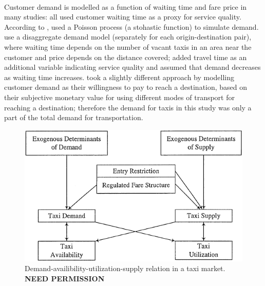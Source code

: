 \paragraph{}Customer demand is modelled as a function of waiting time and fare
price in many studies: \textcite{Douglas1972taxi+regulation,
Devany1975taxi+capacity, Cairns1996taxi+competition, Yang2002taxi+demand} all
used customer waiting time as a proxy for service quality. According to
\textcite{Salanova2011taxi+review}, \textcite{Manski1967taxi+demand} used a
Poisson process (a stohastic function) to simulate demand.
\textcite{Yang2002taxi+demand} use a disaggregate demand model (separately for
each origin-destination pair), where waiting time depends on the number of
vacant taxis in an area near the customer and price depends on the distance
covered; \textcite{Yang2010taxi+nonlinear} added travel time as an additional
variable indicating service quality and assumed that demand decreases as
waiting time increases. \textcite{Yang2010taxi+equilibria} took a slightly
different approach by modelling customer demand as their willingness to pay to
reach a destination, based on their subjective monetary value for using
different modes of transport for reaching a destination; therefore the demand
for taxis in this study was only a part of the total demand for transportation.


\begin{figure}
  \begin{center}
    \includegraphics{../figures/taxi_demand}
    \caption{
      Demand-availibility-utilization-supply relation in a taxi market. 
      \textbf{NEED PERMISSION}
      \label{figure:taxi}
    }
  \end{center}
\end{figure}
